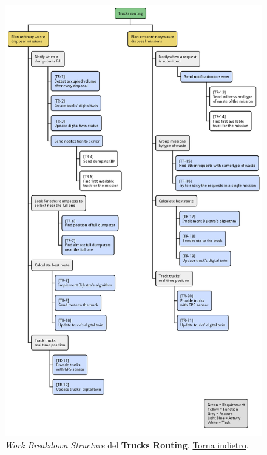 \begin{figure}[H]
    \centering
    \includegraphics[width=\textwidth]{img/wbs-trucks-routing.pm}
    \caption{\textit{Work Breakdown Structure} del \textbf{Trucks Routing}. \hyperlink{back:wbs-trucks-routing}{Torna indietro}.}
    \label{fig:wbs-trucks-routing}
\end{figure}

